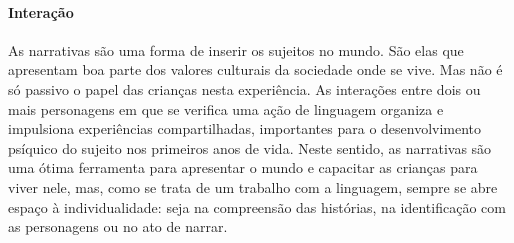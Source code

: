 \documentclass[11pt]{extarticle}
\begin{document}

\paragraph{Interação} As narrativas são uma forma de inserir os sujeitos no mundo. 
São elas que apresentam boa parte dos valores culturais da sociedade 
onde se vive. Mas não é só passivo o papel das crianças nesta experiência. 
As interações entre dois ou mais personagens em que se verifica
uma ação de linguagem organiza e impulsiona experiências compartilhadas,
importantes para o desenvolvimento psíquico do sujeito nos primeiros anos de vida.
Neste sentido, as narrativas são uma ótima ferramenta para
apresentar o mundo e capacitar as crianças para viver nele, mas, como se
trata de um trabalho com a linguagem, sempre se abre espaço à individualidade: 
seja na compreensão das histórias, na identificação com as personagens ou 
no ato de narrar.


\end{document}
